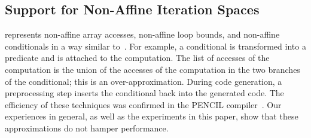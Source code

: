 \vspace{-0.25cm}
\subsection{Support for Non-Affine Iteration Spaces\label{nonaffine}}

\framework represents non-affine array accesses, non-affine loop bounds, and non-affine conditionals in a way similar to~\citet{Benabderrahmane}.
For example, a conditional is transformed into a predicate and is attached to the computation.  The list of accesses of the computation is the union of the accesses of the computation in the two branches of the conditional; this is an over-approximation. During code generation, a preprocessing step inserts the conditional back into the generated code.  The efficiency of these techniques was confirmed in the PENCIL compiler~\cite{pencil}. Our experiences in general, as well as the experiments in this paper, show that these approximations do not hamper performance.

